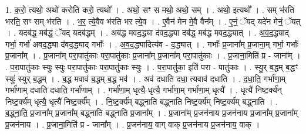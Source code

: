 \documentclass[17pt]{extarticle}
\begin{document}
1. क॒रो॒ त्यथो॒ अथो॑ करोति करो॒ त्यथो᳚ । . अथो॒ सꣳ स मथो॒ अथो॒ सम् । . अथो॒ इत्यथो᳚ । . सम् भ॑रति भरति॒ सꣳ सम् भ॑रति । . भ॒र॒ त्ये॒वैव भ॑रति भर त्ये॒व । . ए॒वैन॑ मेन मे॒वै वैन᳚म् । . ए॒नं॒ ॅयद् यदे॑न मेनं॒ ॅयत् । . यदब॑द्ध॒ मब॑द्धं॒ ॅयद् यदब॑द्धम् । . अब॑द्ध मवद॒द्ध्या द॑वद॒द्ध्या दब॑द्ध॒ मब॑द्ध मवद॒द्ध्यात् । . अ॒व॒द॒द्ध्याद् गर्भा॒ गर्भा॑ अवद॒द्ध्या द॑वद॒द्ध्याद् गर्भाः᳚ । . अ॒व॒द॒द्ध्यादित्य॑व - द॒द्ध्यात् । . गर्भाः᳚ प्र॒जाना᳚म् प्र॒जाना॒म् गर्भा॒ गर्भाः᳚ प्र॒जाना᳚म् । . प्र॒जाना᳚म् परा॒पातु॑काः परा॒पातु॑काः प्र॒जाना᳚म् प्र॒जाना᳚म् परा॒पातु॑काः । . प्र॒जाना॒मिति॑ प्र - जाना᳚म् । . प॒रा॒पातु॑काः स्युः स्युः परा॒पातु॑काः परा॒पातु॑काः स्युः । . प॒रा॒पातु॑का॒ इति॑ परा - पातु॑काः । . स्यु॒र् ब॒द्धम् ब॒द्धꣳ स्युः॑ स्युर् ब॒द्धम् । . ब॒द्ध मवाव॑ ब॒द्धम् ब॒द्ध मव॑ । . अव॑ दधाति दधा॒ त्यवाव॑ दधाति । . द॒धा॒ति॒ गर्भा॑णा॒म् गर्भा॑णाम् दधाति दधाति॒ गर्भा॑णाम् । . गर्भा॑णा॒म् धृत्यै॒ धृत्यै॒ गर्भा॑णा॒म् गर्भा॑णा॒म् धृत्यै᳚ । . धृत्यै॑ निष्ट॒र्क्य॑न् निष्ट॒र्क्य॑म् धृत्यै॒ धृत्यै॑ निष्ट॒र्क्य᳚म् । . नि॒ष्ट॒र्क्य॑म् बद्ध्नाति बद्ध्नाति निष्ट॒र्क्य॑म् निष्ट॒र्क्य॑म् बद्ध्नाति । . ब॒द्ध्ना॒ति॒ प्र॒जाना᳚म् प्र॒जाना᳚म् बद्ध्नाति बद्ध्नाति प्र॒जाना᳚म् । . प्र॒जाना᳚म् प्र॒जन॑नाय प्र॒जन॑नाय प्र॒जाना᳚म् प्र॒जाना᳚म् प्र॒जन॑नाय । . प्र॒जाना॒मिति॑ प्र - जाना᳚म् । . प्र॒जन॑नाय॒ वाग् वाक् प्र॒जन॑नाय प्र॒जन॑नाय॒ वाक् । \newline
\end{document}
